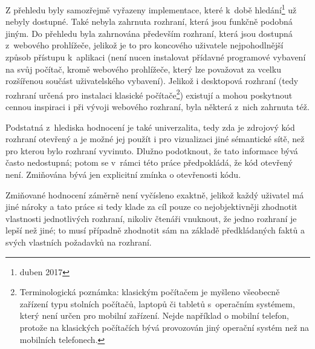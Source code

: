 \documentclass[a4paper,11pt,openany,twoside]{book}
\begin{document}
				Z přehledu byly samozřejmě vyřazeny implementace, které k~době hledání\footnote{duben 2017} už nebyly dostupné. Také nebyla zahrnuta rozhraní, která jsou funkčně podobná jiným. Do přehledu byla zahrnována především rozhraní, která jsou dostupná z~webového prohlížeče, jelikož je to pro koncového uživatele nejpohodlnější způsob přístupu k~aplikaci (není nucen instalovat přídavné programové vybavení na svůj počítač, kromě webového prohlížeče, který lze považovat za vcelku rozšířenou součást uživatelského vybavení). Jelikož i desktopová rozhraní (tedy rozhraní určená pro instalaci klasické počítače\footnote{Terminologická poznámka: klasickým počítačem je myšleno všeobecně zařízení typu stolních počítačů, laptopů či tabletů s~operačním systémem, který není určen pro mobilní zařízení. Nejde například o mobilní telefon, protože na klasických počítačích bývá provozován jiný operační systém než na mobilních telefonech.}) existují a mohou poskytnout cennou inspiraci i při vývoji webového rozhraní, byla některá z~nich zahrnuta též. 

				Podstatná z~hlediska hodnocení je také univerzalita, tedy zda je zdrojový kód rozhraní otevřený a je možné jej použít i pro vizualizaci jiné sémantické sítě, než pro kterou bylo rozhraní vyvinuto. Dlužno podotknout, že tato informace bývá často nedostupná; potom se v~rámci této práce předpokládá, že kód otevřený není. Zmiňována bývá jen explicitní zmínka o otevřenosti kódu.

				Zmiňované hodnocení záměrně není vyčísleno exaktně, jelikož každý uživatel má jiné nároky a tato práce si tedy klade za cíl pouze co nejobjektivněji zhodnotit vlastnosti jednotlivých rozhraní, nikoliv čtenáři vnuknout, že jedno rozhraní je lepší než jiné; to musí případně zhodnotit sám na základě předkládaných faktů a svých vlastních požadavků na rozhraní.

\end{document}
